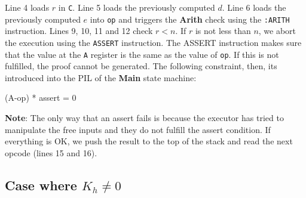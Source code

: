 Line 4 loads $r$ in \texttt{C}. Line 5 loads the previously computed $d$. Line 6 loads the previously computed $e$ into \texttt{op} and triggers the \textbf{Arith} check using the \texttt{:ARITH} instruction. Lines 9, 10, 11 and 12 check $r < n$. If $r$ is not less than $n$, we abort the execution using the \texttt{ASSERT} instruction. The ASSERT instruction makes sure that the value at the \texttt{A} register is the same as 
the value of \texttt{op}. If this is not fulfilled, the proof cannot be generated. The following constraint, then, its introduced into the PIL of the \textbf{Main} state machine:

\begin{pil}
(A-op) * assert = 0
\end{pil}


\textbf{Note}: The only way that an assert fails is because the executor has tried 
to manipulate the free inputs and they do not fulfill the assert condition. If everything is OK, we push the result to the top of the stack and read the next opcode (lines 15 and 16).




\subsection{Case where $K_h \neq 0$}






